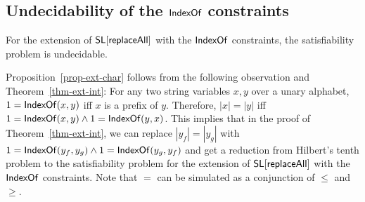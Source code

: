 %
%
%
%
%
%
%

\subsection{Undecidability of the $\mathsf{IndexOf}$ constraints}
 
 \begin{proposition}
	For the extension of $\mathsf{SL}[\mathsf{replaceAll}]$ with the $\mathsf{IndexOf}$ constraints, the satisfiability problem is undecidable. 
\end{proposition}

Proposition~\ref{prop-ext-char} follows from the following observation and Theorem~\ref{thm-ext-int}: For any two string variables $x,y$ over a unary alphabet, 
$1= \mathsf{IndexOf}(x,y)$ iff $x$ is a prefix of $y$. Therefore, $|x| = |y|$ iff $1=  \mathsf{IndexOf}(x,y) \wedge 1= \mathsf{IndexOf}(y,x)$. This implies that in the proof of Theorem~\ref{thm-ext-int}, we can replace $|y_f| = |y_g|$ with $1=\mathsf{IndexOf}(y_f, y_g) \wedge 1 = \mathsf{IndexOf}(y_g, y_f)$ and get a reduction from Hilbert's tenth problem to the satisfiability problem for the extension of $\mathsf{SL}[\mathsf{replaceAll}]$ with the $\mathsf{IndexOf}$ constraints.
Note that $=$ can be simulated as a conjunction of $\leq$ and $\geq$.


%



